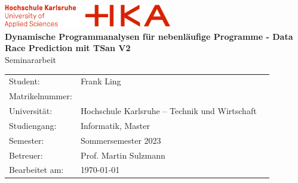 \documentclass[12pt]{article}
\begin{document}
	\begin{titlepage}
		\begin{center}
			\includegraphics[width=0.55\textwidth]{images/hka-logo.png}\\[16ex]
			\LARGE{\textbf{Dynamische Programmanalysen für nebenläufige Programme - Data Race Prediction mit TSan V2}}\\[8ex]
			\Large{{Seminararbeit}}\\[14ex]
			\normalsize{}
			\begin{tabular}{lll}
				Student:            & \quad Frank Ling                                  & \\[2ex]
				Matrikelnummer:     & \quad 79496 & \\[2ex]     %
				Universität:        & \quad Hochschule Karlsruhe – Technik und Wirtschaft   &       \\[2ex]
				Studiengang:        & \quad Informatik, Master                &       \\[2ex]
				Semester:           & \quad Sommersemester 2023                             &       \\[2ex]
				Betreuer:             & \quad Prof. Martin Sulzmann                       &       \\[2ex]
				Bearbeitet am:      & \quad \today                                  &       \\[2ex]
			\end{tabular}
		\end{center}
	\end{titlepage}
	\newpage
	{\hypersetup{linkcolor=black} 
	\tableofcontents}
	\newpage
\end{document}
